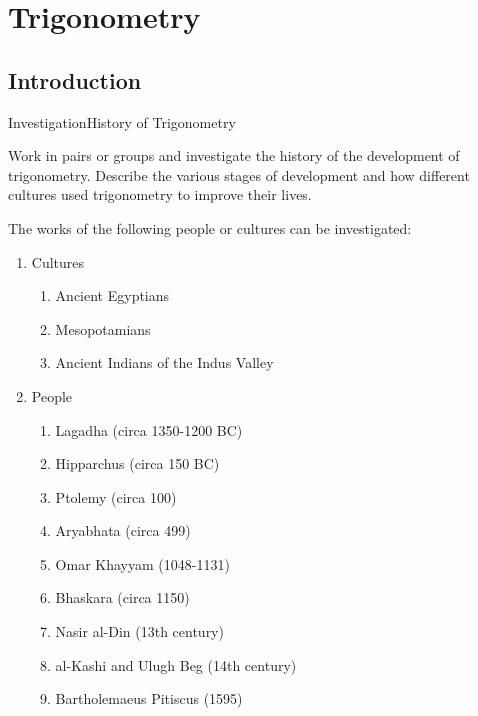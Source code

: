 \chapter{Trigonometry}
\label{m:t11}

\section{Introduction}
\label{mt:h}

\begin{Activity}{Investigation}{History of Trigonometry}{
Work in pairs or groups and investigate the history of the development of trigonometry. Describe the various stages of development and how different cultures used trigonometry to improve their lives.

The works of the following people or cultures can be investigated:
\begin{enumerate}
\item{Cultures}
\begin{enumerate}
\item{Ancient Egyptians}
\item{Mesopotamians}
\item{Ancient Indians of the Indus Valley}
\end{enumerate}
\item{People}
\begin{enumerate}
\item{Lagadha (circa 1350-1200 BC)}
\item{Hipparchus (circa 150 BC)}
\item{Ptolemy (circa 100)}
\item{Aryabhata (circa 499)}
\item{Omar Khayyam (1048-1131)}
\item{Bhaskara (circa 1150)}
\item{Nasir al-Din (13th century)}
\item{al-Kashi and Ulugh Beg (14th century)}\
\item{Bartholemaeus Pitiscus (1595)}
\end{enumerate}
\end{enumerate}
}
\end{Activity}

